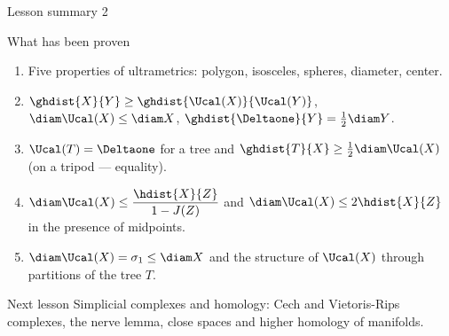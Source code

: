 \documentclass[aspectratio=169,11pt]{beamer}
\begin{document}
\begin{frame}{Lesson summary \textup{2}}
\begin{block}{What has been proven}
\begin{enumerate}
\item Five properties of ultrametrics\textup{:} polygon, isosceles, spheres, diameter, center.
\item $\ghdist{X}{Y} \ge \ghdist{\Ucal(X)}{\Ucal(Y)}$, $\diam\Ucal(X) \le \diam X$, $\ghdist{\Deltaone}{Y} = \frac12\diam Y$.
\item $\Ucal(T) = \Deltaone$ for a tree and $\ghdist{T}{X} \ge \frac12\diam\Ucal(X)$ (on a tripod --- equality).
\item $\diam\Ucal(X) \le \dfrac{\hdist{X}{Z}}{1-J(Z)}$ and $\diam\Ucal(X) \le 2\hdist{X}{Z}$ in the presence of midpoints.
\item $\diam\Ucal(X) = \sigma_1 \le \diam X$ and the structure of $\Ucal(X)$ through partitions of the tree $T$.
\end{enumerate}
\end{block}
\begin{block}{Next lesson}
Simplicial complexes and homology\textup{:} Cech and Vietoris-Rips complexes, the nerve lemma, close spaces and higher homology of manifolds.
\end{block}
\end{frame}
\end{document}
